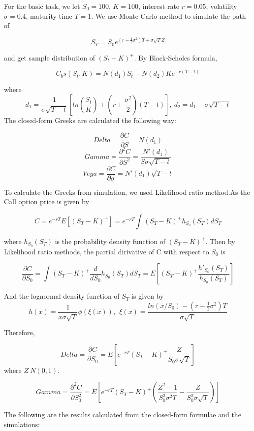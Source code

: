 \documentclass[12pt,a4paper,fleqn]{article}
\begin{document}
For the basic task, we let $S_0 = 100$, $K=100$, interest rate $r = 0.05$, volatility $\sigma = 0.4$, maturity time $T =1$. We use Monte Carlo method to simulate the path of 

$$S_T=S_0e^{(r-\frac{1}{2}\sigma ^2)T+\sigma \sqrt{T}Z} $$

and get sample distribution of $(S_t-K)^+$. By Black-Scholes formula, 

\begin{center}
\begin{equation}
C_bs(S_t, K) = N(d_1)S_t - N(d_2)Ke^{-r(T-t)} 
\end{equation}
\end{center}
where $$d_1=\frac{1}{\sigma \sqrt{T-t}}[ln(\frac{S_t}{K})+(r+\frac{\sigma^2}{2})(T-t)],\ d_2 = d_1-\sigma \sqrt{T-t}$$
The closed-form Greeks are calculated the following way:

$$Delta = \frac{\partial C}{\partial S}=N(d_1)$$
$$Gamma = \frac{\partial^2 C}{\partial S^2}=\frac{N'(d_1)}{S\sigma \sqrt{T-t}}$$
$$Vega =  \frac{\partial C}{\partial \sigma}=N'(d_1)\sqrt{T-t}$$

To calculate the Greeks from simulation, we used Likelihood ratio method.As the Call option price is given by

$$C = e^{-rT}E[(S_T-K)^+]=e^{-rT}\int(S_T-K)^+ h_{S_0}(S_T) dS_T$$

where $ h_{S_0}(S_T)$ is the probability density function of $(S_T-K)^+$. Then by Likelihood ratio methods, the partial dirivative of C with respect to $S_0$ is 

$$\frac{\partial C}{\partial S_0}=\int(S_T-K)^+\frac{d}{dS_0}h_{S_0}(S_T) dS_T=E[(S_T-K)^+\frac{h'_{S_0}(S_T)}{h_{S_0}(S_T)}] $$

And the lognormal density function of $S_T$ is given by
$$h(x)=\frac{1}{x\sigma \sqrt{T}}\phi(\xi(x)), \ \ \xi(x)=\frac{ln(x/S_0)-(r-\frac{1}{2}\sigma^2)T}{\sigma \sqrt{T}}  $$

Therefore, 

$$Delta=\frac{\partial C}{\partial S_0}=E[e^{-rT}(S_T-K)^+\frac{Z}{S_0\sigma\sqrt{T}}]$$
where $Z~N(0,1).$

$$Gamma = \frac{\partial^2 C}{\partial  S_0^2 }=E[e^{-rT}(S_T-K)^+(\frac{Z^2-1}{S_0^2\sigma^2 T } - \frac{Z}{S_0^2 \sigma \sqrt{T}})]$$

The following are the results calculated from the closed-form formulae and the simulations:
\end{document}
